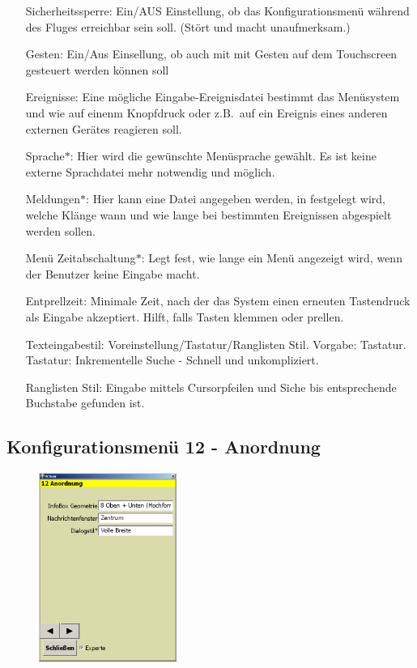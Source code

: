 \begin{enumerate}
\item[Sicherheitssperre:]  Ein/AUS
Einstellung, ob das Konfigurationsmenü während des Fluges  erreichbar sein soll. (Stört und macht unaufmerksam.)
\item[Gesten:] Ein/Aus
Einsellung, ob \xc auch mit mit Gesten auf dem Touchscreen gesteuert werden können soll
\item[Ereignisse:] Eine mögliche Eingabe-Ereignisdatei bestimmt das Menüsystem und wie \xc auf einenm Knopfdruck oder z.B.\ auf ein Ereignis eines anderen externen Gerätes reagieren soll.
\item[Sprache$\ast$:] Hier wird die gewünschte Menüsprache gewählt. Es ist keine externe Sprachdatei mehr notwendig und möglich.
\item[Meldungen$\ast$:] Hier kann eine Datei angegeben werden, in festgelegt wird, welche Klänge wann und wie lange bei bestimmten Ereignissen abgespielt werden sollen.
\item[Menü Zeitabschaltung$\ast$:] Legt fest, wie lange ein Menü angezeigt wird, wenn der Benutzer keine Eingabe macht.
\item[Entprellzeit:]Minimale Zeit, nach der das System einen erneuten Tastendruck als Eingabe akzeptiert. Hilft, falls Tasten klemmen oder prellen.
\item[Texteingabestil:] Voreinstellung/Tastatur/Ranglisten Stil.
Vorgabe: Tastatur.\\
Tastatur: Inkrementelle Suche - Schnell und unkompliziert.

Ranglisten Stil: Eingabe mittels Cursorpfeilen und Siche bis entsprechende Buchstabe gefunden ist.
\end{enumerate}



\subsection{Konfigurationsmenü 12 - Anordnung}\label{Konfig12}
\begin{figure}
\includegraphics[width=4.5cm]{Bilder/Konfig12Anordnung.png}
\end{figure}


